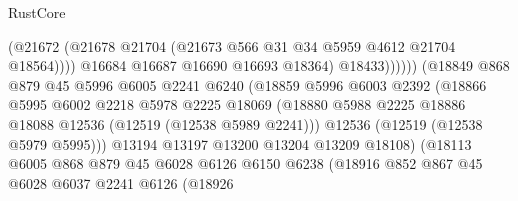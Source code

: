 \begin{lexlean}{RustCore}
\begin{coremodule}
                                            (@21672
                                              (@21678
                                                @21704
                                                (@21673 @566 @31 @34 @5959 @4612 @21704 @18564))))
                                          @16684
                                          @16687
                                          @16690
                                          @16693
                                          @18364)
                                        @18433))))))
                            (@18849
                              @868
                              @879
                              @45
                              @5996
                              @6005
                              @2241
                              @6240
                              (@18859
                                @5996
                                @6003
                                @2392
                                (@18866
                                  @5995
                                  @6002
                                  @2218
                                  @5978
                                  @2225
                                  @18069
                                  (@18880
                                    @5988
                                    @2225
                                    @18886
                                    @18088
                                    @12536
                                    (@12519 (@12538 @5989 @2241)))
                                  @12536
                                  (@12519 (@12538 @5979 @5995)))
                                @13194
                                @13197
                                @13200
                                @13204
                                @13209
                                @18108)
                              (@18113
                                @6005
                                @868
                                @879
                                @45
                                @6028
                                @6126
                                @6150
                                @6238
                                (@18916
                                  @852
                                  @867
                                  @45
                                  @6028
                                  @6037
                                  @2241
                                  @6126
                                  (@18926

\end{coremodule}
\end{lexlean}
